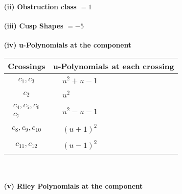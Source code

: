 \documentclass[1p]{elsarticle_modified}
\theoremstyle{definition}
\begin{document}
\flushleft \textbf{(ii) Obstruction class $= 1$}\\~\\
\flushleft \textbf{(iii) Cusp Shapes $= -5$}\\~\\
\newpage\renewcommand{\arraystretch}{1}
\flushleft \textbf{(iv) u-Polynomials at the component}\newline \\
\begin{tabular}{m{50pt}|m{274pt}}
Crossings & \hspace{64pt}u-Polynomials at each crossing \\
\hline $$\begin{aligned}c_{1},c_{3}\end{aligned}$$&$\begin{aligned}
&u^2+u-1
\end{aligned}$\\
\hline $$\begin{aligned}c_{2}\end{aligned}$$&$\begin{aligned}
&u^2
\end{aligned}$\\
\hline $$\begin{aligned}c_{4},c_{5},c_{6}\\c_{7}\end{aligned}$$&$\begin{aligned}
&u^2- u-1
\end{aligned}$\\
\hline $$\begin{aligned}c_{8},c_{9},c_{10}\end{aligned}$$&$\begin{aligned}
&(u+1)^2
\end{aligned}$\\
\hline $$\begin{aligned}c_{11},c_{12}\end{aligned}$$&$\begin{aligned}
&(u-1)^2
\end{aligned}$\\
\hline
\end{tabular}\\~\\
\newpage\renewcommand{\arraystretch}{1}
\flushleft \textbf{(v) Riley Polynomials at the component}\newline \\
\end{document}
